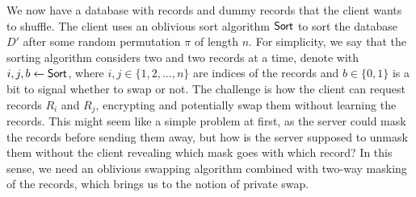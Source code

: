 \clearpage

We now have a database with records and dummy records that the client wants to shuffle. The client uses an oblivious sort algorithm $ \mathsf{{Sort}} $ to sort the database $ D' $ after some random permutation $ \pi $ of length $ n $. For simplicity, we say that the sorting algorithm considers two and two records at a time, denote with $ i, j, b \gets \mathsf{{Sort}} $, where $ i, j \in \lbrace 1, 2, ... , n \rbrace $ are indices of the records and $ b \in \lbrace 0, 1 \rbrace $ is a bit to signal whether to swap or not. The challenge is how the client can request records $ R_i $ and $ R_j $, encrypting and potentially swap them without learning the records. This might seem like a simple problem at first, as the server could mask the records before sending them away, but how is the server supposed to unmask them without the client revealing which mask goes with which record? In this sense, we need an oblivious swapping algorithm combined with two-way masking of the records, which brings us to the notion of private swap.

\hfill

